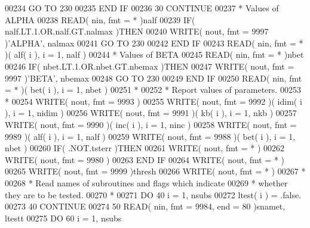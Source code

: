 \begin{DoxyCode}
00234             \textcolor{keywordflow}{GO TO} 230
00235 \textcolor{keywordflow}{         END IF}
00236    30 \textcolor{keywordflow}{CONTINUE}
00237 \textcolor{comment}{*     Values of ALPHA}
00238       \textcolor{keyword}{READ}( nin, fmt = * )nalf
00239       \textcolor{keywordflow}{IF}( nalf.LT.1.OR.nalf.GT.nalmax )\textcolor{keywordflow}{THEN}
00240          \textcolor{keyword}{WRITE}( nout, fmt = 9997 )\textcolor{stringliteral}{'ALPHA'}, nalmax
00241          \textcolor{keywordflow}{GO TO} 230
00242 \textcolor{keywordflow}{      END IF}
00243       \textcolor{keyword}{READ}( nin, fmt = * )( alf( i ), i = 1, nalf )
00244 \textcolor{comment}{*     Values of BETA}
00245       \textcolor{keyword}{READ}( nin, fmt = * )nbet
00246       \textcolor{keywordflow}{IF}( nbet.LT.1.OR.nbet.GT.nbemax )\textcolor{keywordflow}{THEN}
00247          \textcolor{keyword}{WRITE}( nout, fmt = 9997 )\textcolor{stringliteral}{'BETA'}, nbemax
00248          \textcolor{keywordflow}{GO TO} 230
00249 \textcolor{keywordflow}{      END IF}
00250       \textcolor{keyword}{READ}( nin, fmt = * )( bet( i ), i = 1, nbet )
00251 \textcolor{comment}{*}
00252 \textcolor{comment}{*     Report values of parameters.}
00253 \textcolor{comment}{*}
00254       \textcolor{keyword}{WRITE}( nout, fmt = 9993 )
00255       \textcolor{keyword}{WRITE}( nout, fmt = 9992 )( idim( i ), i = 1, nidim )
00256       \textcolor{keyword}{WRITE}( nout, fmt = 9991 )( kb( i ), i = 1, nkb )
00257       \textcolor{keyword}{WRITE}( nout, fmt = 9990 )( inc( i ), i = 1, ninc )
00258       \textcolor{keyword}{WRITE}( nout, fmt = 9989 )( alf( i ), i = 1, nalf )
00259       \textcolor{keyword}{WRITE}( nout, fmt = 9988 )( bet( i ), i = 1, nbet )
00260       \textcolor{keywordflow}{IF}( .NOT.tsterr )\textcolor{keywordflow}{THEN}
00261          \textcolor{keyword}{WRITE}( nout, fmt = * )
00262          \textcolor{keyword}{WRITE}( nout, fmt = 9980 )
00263 \textcolor{keywordflow}{      END IF}
00264       \textcolor{keyword}{WRITE}( nout, fmt = * )
00265       \textcolor{keyword}{WRITE}( nout, fmt = 9999 )thresh
00266       \textcolor{keyword}{WRITE}( nout, fmt = * )
00267 \textcolor{comment}{*}
00268 \textcolor{comment}{*     Read names of subroutines and flags which indicate}
00269 \textcolor{comment}{*     whether they are to be tested.}
00270 \textcolor{comment}{*}
00271       \textcolor{keywordflow}{DO} 40 i = 1, nsubs
00272          ltest( i ) = .false.
00273    40 \textcolor{keywordflow}{CONTINUE}
00274    50 \textcolor{keyword}{READ}( nin, fmt = 9984, end = 80 )snamet, ltestt
00275       \textcolor{keywordflow}{DO} 60 i = 1, nsubs

\end{DoxyCode}
